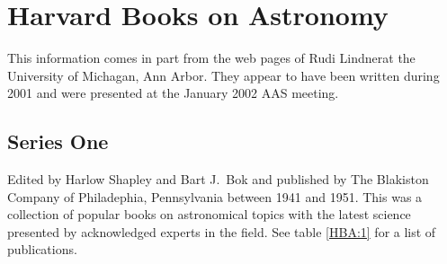 \section{Harvard Books on Astronomy}

This information comes in part from the web pages of Rudi
Lindner\footnotemark at the University of Michagan, Ann Arbor. They
appear to have been written during 2001 and were presented at the
January 2002 AAS meeting.


\subsection{Series One}

Edited by Harlow Shapley and Bart J.\ Bok and published by The
Blakiston Company of Philadephia, Pennsylvania between 1941 and 1951.
This was a collection of popular books on astronomical topics with the
latest science presented by acknowledged experts in the field. See
table \ref{HBA:1} for a list of publications.

